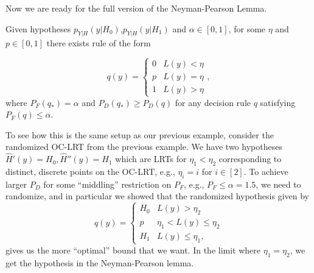 Now we are ready for the full version of the Neyman-Pearson Lemma. 
\begin{theorem}

Given hypotheses $p_{Y|H}(y|H_0)$,$p_{Y|H}(y|H_1)$ and $\alpha\in [0,1]$, for some $\eta$ and $p\in [0,1]$ there exists rule of the form 

\[
q(y) = \begin{cases}
	0 & L(y) < \eta \\
	p & L(y) = \eta \\
	1 & L(y) > \eta
\end{cases},
\] 
where $P_F(q_*) = \alpha$ and $P_D(q_*)\geq P_D(q)$ for any decision rule $q$ satisfying $P_F(q)\leq \alpha$.
\end{theorem}

To see how this is the same setup as our previous example, consider the randomized OC-LRT from the previous example. We have two hypotheses $\hat{H}'(y)=H_0,\hat{H}''(y)=H_1$ which are LRTs for $\eta_1<\eta_2$ corresponding to distinct, discrete points on the OC-LRT, e.g., $\eta_i=i$ for $i\in [2]$. To achieve larger $P_D$ for some ``middling'' restriction on $P_F$, e.g., $P_F\leq \alpha = 1.5$, we need to randomize, and in particular we showed that the randomized hypothesis given by 
\[q(y) = \begin{cases}
	H_0 & L(y) > \eta_2 \\
	p & \eta_1 < L(y) \leq \eta_2 \\
	H_1 & L(y) \leq \eta_1,
\end{cases}\] 
gives us the more ``optimal'' bound that we want. In the limit where $\eta_1=\eta_2$, we get
the hypothesis in the Neyman-Pearson lemma.

